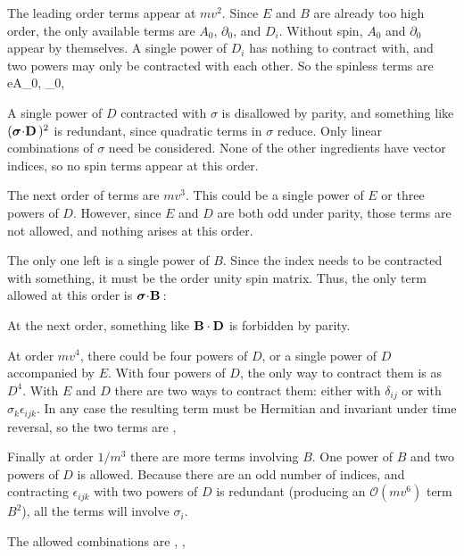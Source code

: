 The leading order terms appear at $mv^2$.  Since $E$ and $B$ are already too high order, the only available terms are $A_0$, $\partial_0$, and $D_i$.  
Without spin, $A_0$ and $\partial_0$ appear by themselves.  A single power of $D_i$ has nothing to contract with, and two powers may only be contracted with each other.  So the spinless terms are
\beq
	eA_0, \;  \partial_0,  \; 
\eeq

A single power of $D$ contracted with $\sigma$ is disallowed by parity, and something like $(\mbox{\boldmath$ \sigma $} \hspace{-2pt} \cdot \hspace{-2pt} \mathbf{D} \,)^2$ is redundant, since quadratic terms in $\sigma$ reduce.  Only linear combinations of $\sigma$ need be considered.  None of the other ingredients have vector indices, so no spin terms appear at this order.

The next order of terms are $mv^3$.  This could be a single power of $E$ or three powers of $D$.  However, since $E$ and $D$ are both odd under parity, those terms are not allowed, and nothing arises at this order.



The only one left is a single power of $B$.  Since the index needs to be contracted with something, it must be the order unity spin matrix.  Thus, the only term allowed at this order is $\mbox{\boldmath$ \sigma $} \hspace{-2pt} \cdot \hspace{-2pt} \mathbf{B} \,$:
\beq
\eeq

At the next order, something like $\mathbf{B} \cdot \mathbf{D}$ is forbidden by parity.

At order $mv^4$, there could be four powers of $D$, or a single power of $D$ accompanied by $E$.    With four powers of $D$, the only way to contract them is as $D^4$.  With $E$ and $D$ there are two ways to contract them: either with $\delta_{ij}$ or with $\sigma_k \epsilon_{ijk}$.  In any case the resulting term must be Hermitian and invariant under time reversal, so the two terms are
\beq
	 , \;  
\eeq 


Finally at order $1/m^3$ there are more terms involving $B$.  One power of $B$ and two powers of $D$ is allowed.  Because there are an odd number of indices, and contracting $\epsilon_{ijk}$ with two powers of $D$ is redundant (producing an $\mathcal{O}(mv^6)$ term $B^2$), all the terms will involve $\sigma_i$.

The allowed combinations are
\beq
  ,  \;
			, 	\;
\eeq

